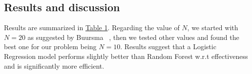 \documentclass{article}
\begin{document}
\subsection{Results and discussion}
Results are summarized in \hyperref[tab:Tab1]{Table 1}. Regarding the value of $N$, we started with $N=20$ as suggested by Buursma ~\cite{Buursma2010}, then we tested other values and found the best one for our problem being $N=10$. Results suggest that a Logistic Regression model performs slightly better than Random Forest w.r.t effectiveness and is significantly more efficient. 
\begin{table}[H]
    \centering
    \caption{Results for different values of N and different models}
    \label{tab:Tab1}
\end{table}


\newpage


\end{document}
